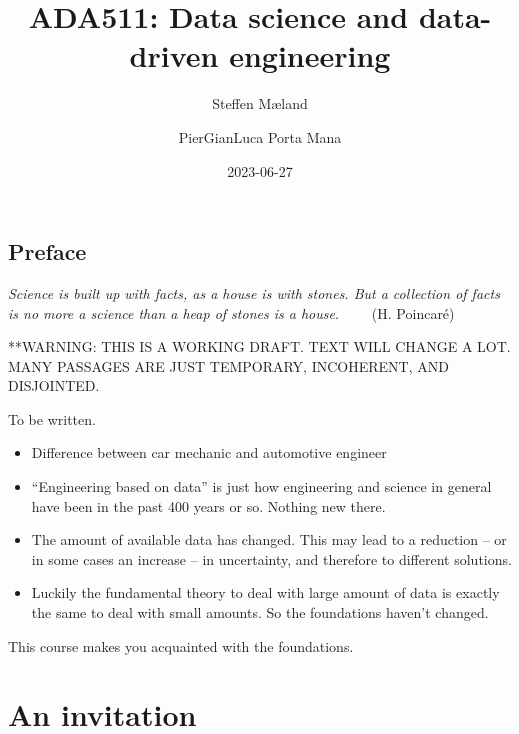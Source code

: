 \documentclass[
  a4paper,
  DIV=11,
  numbers=noendperiod,
  oneside]{scrreprt}
\title{ADA511: Data science and data-driven engineering}
\author{Steffen Mæland \and PierGianLuca Porta Mana}
\date{2023-06-27}
\renewcommand*\contentsname{Table of contents}
\newcommand\contentsname{Table of contents}
\begin{document}
\maketitle
\ifdefined\Shaded\renewenvironment{Shaded}{\begin{tcolorbox}[boxrule=0pt, borderline west={3pt}{0pt}{shadecolor}, breakable, enhanced, frame hidden, interior hidden, sharp corners]}{\end{tcolorbox}}\fi

\renewcommand*\contentsname{Table of contents}
{
\hypersetup{linkcolor=}
\setcounter{tocdepth}{2}
\tableofcontents
}

\hypertarget{preface}{%
\chapter*{Preface}\label{preface}}


\hfill\break
\hfill\break
\hfill\break
\hfill\break
\hfill\break
\hfill\break

\emph{Science is built up with facts, as a house is with stones. But a
collection of facts is no more a science than a heap of stones is a
house.} ~~~~{(H. Poincaré)}

**WARNING: THIS IS A WORKING DRAFT. TEXT WILL CHANGE A LOT. MANY
PASSAGES ARE JUST TEMPORARY, INCOHERENT, AND DISJOINTED.

To be written.

\begin{itemize}
\item
  Difference between car mechanic and automotive engineer
\item
  ``Engineering based on data'' is just how engineering and science in
  general have been in the past 400 years or so. Nothing new there.
\item
  The amount of available data has changed. This may lead to a reduction
  -- or in some cases an increase -- in uncertainty, and therefore to
  different solutions.
\item
  Luckily the fundamental theory to deal with large amount of data is
  exactly the same to deal with small amounts. So the foundations
  haven't changed.
\end{itemize}

This course makes you acquainted with the foundations.

\part{An invitation}
\end{document}
